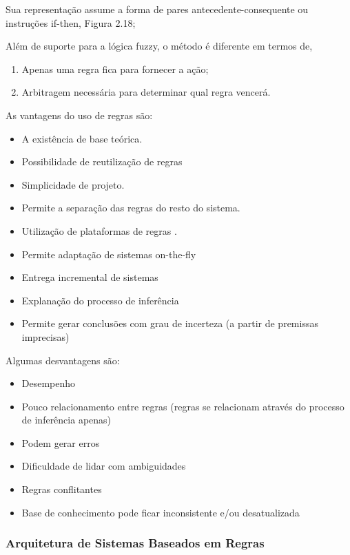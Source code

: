 \documentclass[12pt,a4paper,compsoc]{IEEEtran}
\begin{document}
  Sua representação assume a forma de pares antecedente-consequente ou instruções if-then, Figura
  2.18;
  
  Além de suporte para a lógica fuzzy, o método é diferente em termos de,
  
  \begin{enumerate}
    \item Apenas uma regra fica para fornecer a ação;
    \item Arbitragem necessária para determinar qual regra vencerá.
  \end{enumerate}
  
  As vantagens do uso de regras são:

  \begin{itemize}
    \item A existência de base teórica.
    \item Possibilidade de reutilização de regras
    \item Simplicidade de projeto. 
    \item Permite a separação das regras do resto do sistema.
    \item Utilização de plataformas de regras .
    \item Permite adaptação de sistemas on-the-fly
    \item Entrega incremental de sistemas
    \item Explanação do processo de inferência
    \item Permite gerar conclusões com grau de incerteza (a partir de premissas imprecisas)
  \end{itemize}
  
  Algumas desvantagens são:

  \begin{itemize}
    \item Desempenho
    \item Pouco relacionamento entre regras (regras se relacionam através do processo de inferência
    apenas)
    \item Podem gerar erros
    \item Dificuldade de lidar com ambiguidades
    \item Regras conflitantes
    \item Base de conhecimento  pode ficar inconsistente e/ou desatualizada  
  \end{itemize}


\subsubsection{Arquitetura de Sistemas Baseados em Regras}
\end{document}
